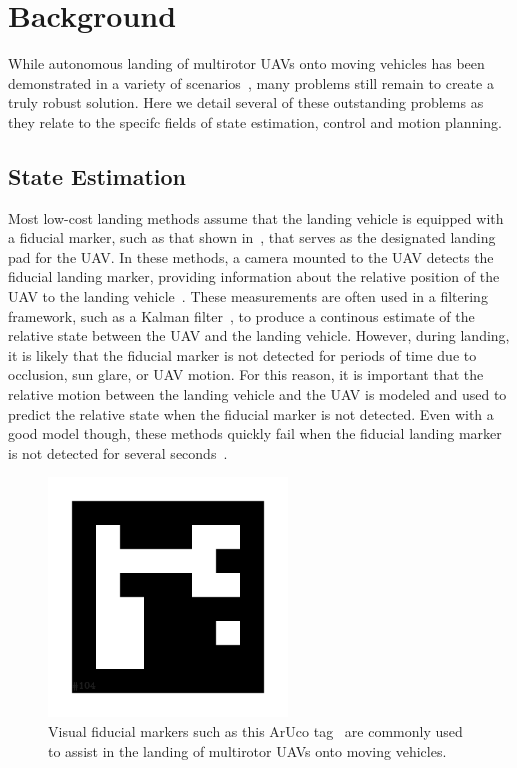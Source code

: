 \section{Background}

While autonomous landing of multirotor UAVs onto moving vehicles has been
demonstrated in a variety of scenarios~\cite{wynn2019visual}, many problems still remain to
create a truly robust solution. Here we detail several of these outstanding
problems as they relate to the specifc fields of state estimation, control and
motion planning.

\subsection{State Estimation}
Most low-cost landing methods assume that the landing vehicle is equipped with a
fiducial marker, such as that shown in~, that serves as
the designated landing pad for the UAV.
In these methods, a camera mounted to the UAV detects the fiducial landing marker, providing
information about the relative position of the UAV to the landing
vehicle~\cite{borowczyk2017autonomous}. These measurements are often used in a
filtering framework, such as a Kalman filter~\cite{kalman}, to produce a
continous estimate of the relative state between the UAV and the landing
vehicle. However, during landing, it is likely
that the fiducial marker is not detected for periods of time due to occlusion,
sun glare, or UAV motion. For this reason, it is important that the relative
motion between the landing vehicle and the UAV is modeled and used to predict
the relative state when the fiducial marker is not detected.
Even with a good model though,
these methods quickly fail when the fiducial landing
marker is not detected for several seconds~\cite{ling2014precision}.

\begin{figure}[h]
  \centering
  \includegraphics[width=2.5in]{figures/aruco_104.png}
  \caption[Visual Fiducial Landing Marker]{Visual fiducial markers such as this
    ArUco tag~\cite{garrido2016generation} are commonly used to assist in the
  landing of multirotor UAVs onto moving vehicles.}
  \label{fig:aruco_tag}
\end{figure}

